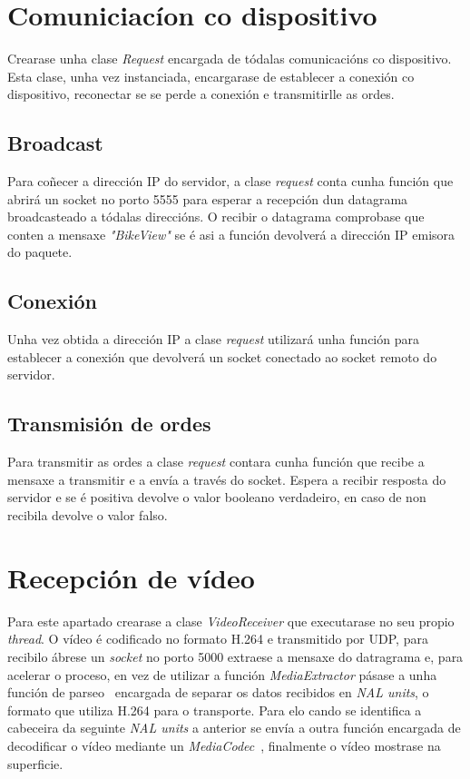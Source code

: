 \section{Comuniciacíon co dispositivo}
Crearase unha clase \emph{Request} encargada de tódalas comunicacións co dispositivo.  Esta clase, unha vez instanciada, encargarase de establecer a conexión co dispositivo, reconectar se se perde a conexión e transmitirlle as ordes.

\subsection{Broadcast}
Para coñecer a dirección IP do servidor, a clase \emph{request} conta cunha función que abrirá un socket no porto 5555 para esperar a recepción dun datagrama broadcasteado a tódalas direccións. O recibir o datagrama comprobase que conten a mensaxe \emph{"BikeView"} se é asi a función devolverá a dirección IP emisora do paquete.

\subsection{Conexión}
Unha vez obtida a dirección IP a clase \emph{request} utilizará unha función para establecer a conexión que devolverá un socket conectado ao socket remoto do servidor.

\subsection{Transmisión de ordes}
Para transmitir as ordes a clase \emph{request} contara cunha función que recibe a mensaxe a transmitir e a envía a través do socket. Espera a recibir resposta do servidor e se é positiva devolve o valor booleano verdadeiro, en caso de non recibila devolve o valor falso.

\section{Recepción de vídeo}
Para este apartado crearase a clase \emph{VideoReceiver} que executarase no seu propio \emph{thread}. O vídeo é codificado no formato H.264 e transmitido por UDP, para recibilo ábrese un \emph{socket} no porto 5000 extraese a mensaxe do datragrama e, para acelerar o proceso, en vez de utilizar a función \emph{MediaExtractor} pásase a unha función de parseo~\cite{consti10ContributeConsti10MyMediaCodecPlayerforFPV2018a} encargada de separar os datos recibidos en \emph{NAL units}, o formato que utiliza H.264 para o transporte. Para elo cando se identifica a cabeceira da seguinte \emph{NAL units} a anterior se envía a outra función encargada de decodificar o vídeo mediante un \emph{MediaCodec}~\cite{MediaCodec}, finalmente o vídeo mostrase na superficie.

